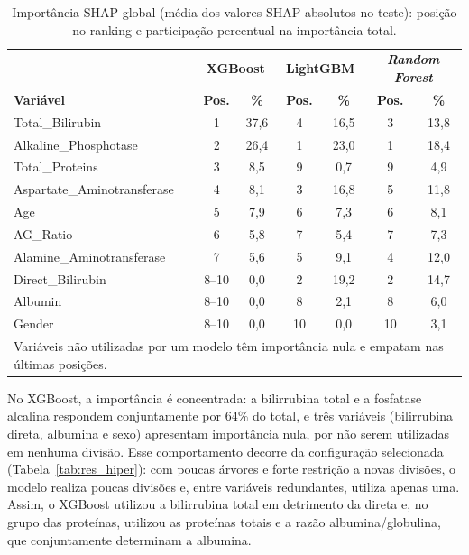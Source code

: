 \begin{table}[htbp]
\centering
\begin{tabular}{lcccccc}
\hline
 & \multicolumn{2}{c}{\textbf{XGBoost}} & \multicolumn{2}{c}{\textbf{LightGBM}} & \multicolumn{2}{c}{\textbf{\textit{Random Forest}}} \\
\textbf{Variável} & \textbf{Pos.} & \textbf{\%} & \textbf{Pos.} & \textbf{\%} & \textbf{Pos.} & \textbf{\%} \\
\hline
Total\_Bilirubin            & 1     & 37,6 & 4  & 16,5 & 3  & 13,8 \\
Alkaline\_Phosphotase       & 2     & 26,4 & 1  & 23,0 & 1  & 18,4 \\
Total\_Proteins             & 3     & 8,5  & 9  & 0,7  & 9  & 4,9 \\
Aspartate\_Aminotransferase & 4     & 8,1  & 3  & 16,8 & 5  & 11,8 \\
Age                         & 5     & 7,9  & 6  & 7,3  & 6  & 8,1 \\
AG\_Ratio                   & 6     & 5,8  & 7  & 5,4  & 7  & 7,3 \\
Alamine\_Aminotransferase   & 7     & 5,6  & 5  & 9,1  & 4  & 12,0 \\
Direct\_Bilirubin           & 8--10 & 0,0  & 2  & 19,2 & 2  & 14,7 \\
Albumin                     & 8--10 & 0,0  & 8  & 2,1  & 8  & 6,0 \\
Gender                      & 8--10 & 0,0  & 10 & 0,0  & 10 & 3,1 \\
\hline
\multicolumn{7}{l}{\footnotesize Variáveis não utilizadas por um modelo têm importância nula e empatam nas últimas posições.} \\
\end{tabular}
\caption{Importância SHAP global (média dos valores SHAP absolutos no teste): posição no ranking e participação percentual na importância total.}
\label{tab:res_shap_imp}
\end{table}

No XGBoost, a importância é concentrada: a bilirrubina total e a fosfatase alcalina respondem conjuntamente por 64\% do total, e três variáveis (bilirrubina direta, albumina e sexo) apresentam importância nula, por não serem utilizadas em nenhuma divisão. Esse comportamento decorre da configuração selecionada (Tabela~\ref{tab:res_hiper}): com poucas árvores e forte restrição a novas divisões, o modelo realiza poucas divisões e, entre variáveis redundantes, utiliza apenas uma. Assim, o XGBoost utilizou a bilirrubina total em detrimento da direta e, no grupo das proteínas, utilizou as proteínas totais e a razão albumina/globulina, que conjuntamente determinam a albumina.

